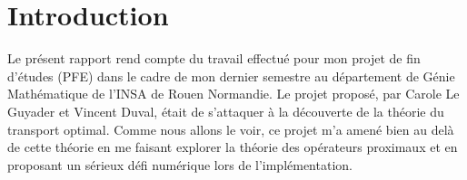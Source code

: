 \documentclass[a4paper,12pt]{article}
\title{\titre }
\author{\auteur}
\date{\dateDoc}
\newcommand\blankpage{%
    \null
    \thispagestyle{empty}%
    \addtocounter{page}{-1}%
    \newpage}
\begin{document}
\afterpage{\blankpage}
\thispagestyle{empty}
\maketitle
\tableofcontents
\newpage


\section{Introduction}

Le présent rapport rend compte du travail effectué pour mon projet de fin d'études (PFE) dans le cadre de mon dernier semestre au département de Génie Mathématique de l'INSA de Rouen Normandie. Le projet proposé, par Carole Le Guyader et Vincent Duval, était de s'attaquer à la découverte de la théorie du transport optimal. Comme nous allons le voir, ce projet m'a amené bien au delà de cette théorie en me faisant explorer la théorie des opérateurs proximaux et en proposant un sérieux défi numérique lors de l'implémentation. \\
\end{document}
